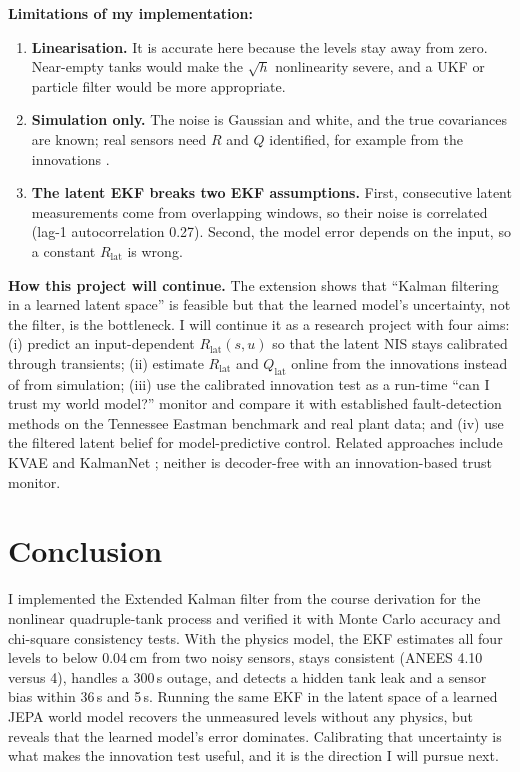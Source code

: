 \documentclass[11pt]{article}
\begin{document}
\textbf{Limitations of my implementation:}
\begin{enumerate}\itemsep0pt
\item \textbf{Linearisation.} It is accurate here because the levels stay away from zero. Near-empty tanks would make the $\sqrt h$ nonlinearity severe, and a UKF \cite{julier2004} or particle filter would be more appropriate.
\item \textbf{Simulation only.} The noise is Gaussian and white, and the true covariances are known; real sensors need $R$ and $Q$ identified, for example from the innovations \cite{mehra1970}.
\item \textbf{The latent EKF breaks two EKF assumptions.} First, consecutive latent measurements come from overlapping windows, so their noise is correlated (lag-1 autocorrelation 0.27). Second, the model error depends on the input, so a constant $R_{\text{lat}}$ is wrong.
\end{enumerate}

\textbf{How this project will continue.} The extension shows that ``Kalman filtering in a learned latent space'' is feasible but that the learned model's uncertainty, not the filter, is the bottleneck. I will continue it as a research project with four aims: (i) predict an input-dependent $R_{\text{lat}}(s,u)$ so that the latent NIS stays calibrated through transients; (ii) estimate $R_{\text{lat}}$ and $Q_{\text{lat}}$ online from the innovations instead of from simulation; (iii) use the calibrated innovation test as a run-time ``can I trust my world model?'' monitor and compare it with established fault-detection methods on the Tennessee Eastman benchmark and real plant data; and (iv) use the filtered latent belief for model-predictive control. Related approaches include KVAE \cite{fraccaro2017kvae} and KalmanNet \cite{revach2022kalmannet}; neither is decoder-free with an innovation-based trust monitor.

\section{Conclusion}
I implemented the Extended Kalman filter from the course derivation for the nonlinear quadruple-tank process and verified it with Monte Carlo accuracy and chi-square consistency tests. With the physics model, the EKF estimates all four levels to below 0.04\,cm from two noisy sensors, stays consistent (ANEES 4.10 versus 4), handles a 300\,s outage, and detects a hidden tank leak and a sensor bias within 36\,s and 5\,s. Running the same EKF in the latent space of a learned JEPA world model recovers the unmeasured levels without any physics, but reveals that the learned model's error dominates. Calibrating that uncertainty is what makes the innovation test useful, and it is the direction I will pursue next.
\end{document}
